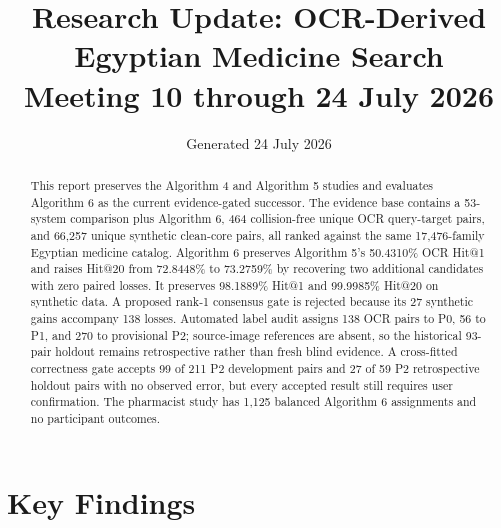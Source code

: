 \documentclass[11pt,a4paper]{article}
\title{\textbf{Research Update: OCR-Derived Egyptian Medicine Search}\\
\large Meeting 10 through 24 July 2026}
\author{}
\date{Generated 24 July 2026}
\begin{document}
\maketitle

\begin{abstract}
This report preserves the Algorithm 4 and Algorithm 5 studies and evaluates
Algorithm 6 as the current evidence-gated successor. The evidence base contains
a 53-system comparison plus Algorithm 6, 464 collision-free unique OCR
query-target pairs, and 66,257 unique synthetic clean-core pairs, all ranked
against the same 17,476-family Egyptian medicine catalog. Algorithm 6 preserves
Algorithm 5's 50.4310\% OCR Hit@1 and raises Hit@20 from 72.8448\% to
73.2759\% by recovering two additional candidates with zero paired losses. It
preserves 98.1889\% Hit@1 and 99.9985\% Hit@20 on synthetic data. A proposed
rank-1 consensus gate is rejected because its 27 synthetic gains accompany 138
losses. Automated label audit assigns 138 OCR pairs to P0, 56 to P1, and 270
to provisional P2; source-image references are absent, so the historical
93-pair holdout remains retrospective rather than fresh blind evidence. A
cross-fitted correctness gate accepts 99 of 211 P2 development pairs and 27 of
59 P2 retrospective holdout pairs with no observed error, but every accepted
result still requires user confirmation. The pharmacist study has 1,125
balanced Algorithm 6 assignments and no participant outcomes.
\end{abstract}

\tableofcontents

\section{Key Findings}
\end{document}
